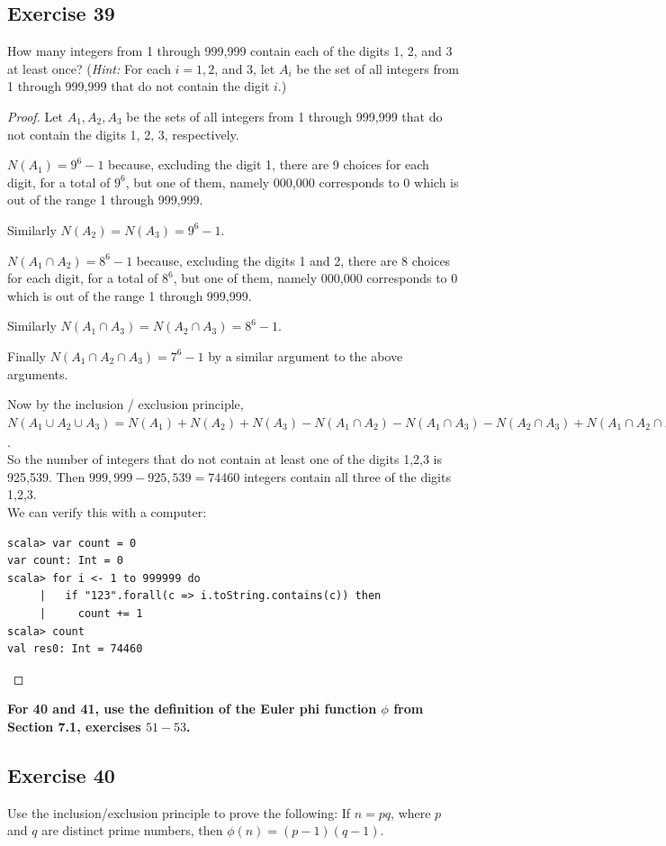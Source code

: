 \documentclass[14pt]{extarticle}
\newcommand{\cy}{\color{cyan}}
\begin{document}
\subsection{Exercise 39}
How many integers from 1 through 999,999 contain each of the digits 1, 2, and 3 at least once? ({\it Hint:} For each 
\(i = 1, 2\), and 3, let \(A_i\) be the set of all integers from 1 through 999,999 that do not contain the digit $i$.)

\begin{proof}
Let \(A_1, A_2, A_3\) be the sets of all integers from 1 through 999,999 that do not contain the digits 1, 2, 3,
respectively.

\(N(A_1) = 9^6 - 1\) because, excluding the digit 1, there are 9 choices for each digit, for a total of \(9^6\), but
one of them, namely 000,000 corresponds to 0 which is out of the range 1 through 999,999.

Similarly \(N(A_2) = N(A_3) = 9^6-1\).

\(N(A_1 \cap A_2) = 8^6 - 1\) because, excluding the digits 1 and 2, there are 8 choices for each digit, for a total of 
\(8^6\), but one of them, namely 000,000 corresponds to 0 which is out of the range 1 through 999,999.

Similarly \(N(A_1 \cap A_3) = N(A_2 \cap A_3) = 8^6 - 1\).

Finally \(N(A_1 \cap A_2 \cap A_3) = 7^6-1\) by a similar argument to the above arguments. 

Now by the inclusion / exclusion principle, \(N(A_1 \cup A_2 \cup A_3) = N(A_1) + N(A_2) + N(A_3) - N(A_1 \cap A_2) 
- N(A_1 \cap A_3) - N(A_2 \cap A_3) + N(A_1 \cap A_2 \cap A_3) = 3(9^6-1) - 3(8^6-1) + 7^6-1 = 925,539\). \\
So the number of integers that do not contain at least one of the digits 1,2,3 is 925,539. Then \(999,999 - 925,539 = 
74460\) integers contain all three of the digits 1,2,3. \\
We can verify this with a computer:
\begin{verbatim}
scala> var count = 0
var count: Int = 0
scala> for i <- 1 to 999999 do
     |   if "123".forall(c => i.toString.contains(c)) then
     |     count += 1
scala> count
val res0: Int = 74460
\end{verbatim}
\end{proof}

{\bf \cy For 40 and 41, use the definition of the Euler phi function \(\phi\) from Section 7.1, exercises $51-53$.}

\subsection{Exercise 40}
Use the inclusion/exclusion principle to prove the following: If \(n = pq\), where $p$ and $q$ are distinct prime numbers, then \(\phi(n) = (p - 1)(q - 1)\).
\end{document}
